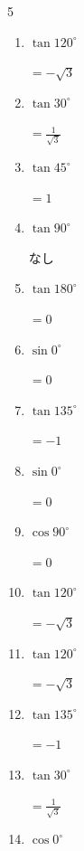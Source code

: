 \begin{multicols}{5}
\begin{enumerate}
  \item $\displaystyle \tan{120^\circ}$

        $\displaystyle =-\sqrt{3}$

  \item $\displaystyle \tan{30^\circ}$

        $\displaystyle =\frac{1}{\sqrt{3}}$

  \item $\displaystyle \tan{45^\circ}$

        $\displaystyle =1$

\columnbreak %

  \item $\displaystyle \tan{90^\circ}$

        $\displaystyle なし$

  \item $\displaystyle \tan{180^\circ}$

        $\displaystyle =0$

  \item $\displaystyle \sin{0^\circ}$

        $\displaystyle =0$

  \item $\displaystyle \tan{135^\circ}$

        $\displaystyle =-1$

  \item $\displaystyle \sin{0^\circ}$

        $\displaystyle =0$

  \item $\displaystyle \cos{90^\circ}$

        $\displaystyle =0$

  \item $\displaystyle \tan{120^\circ}$

        $\displaystyle =-\sqrt{3}$

  \item $\displaystyle \tan{120^\circ}$

        $\displaystyle =-\sqrt{3}$

  \item $\displaystyle \tan{135^\circ}$

        $\displaystyle =-1$

  \item $\displaystyle \tan{30^\circ}$

        $\displaystyle =\frac{1}{\sqrt{3}}$

  \item $\displaystyle \cos{0^\circ}$


\end{enumerate}
\end{multicols}
